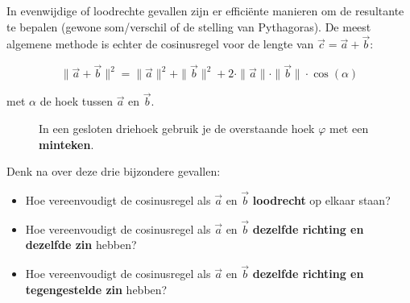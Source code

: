 \documentclass{ximera}
\begin{document}
In evenwijdige of loodrechte gevallen zijn er efficiënte manieren om de resultante te bepalen (gewone som/verschil of de stelling van Pythagoras). De meest algemene methode is echter de cosinusregel voor de lengte van $\vec{c} = \vec{a} + \vec{b}$:

\[ \| \vec{a} + \vec{b} \|^2 = \| \vec{a} \|^2 + \| \vec{b} \|^2 + 2 \cdot \|\vec{a}\| \cdot \|\vec{b}\| \cdot \cos(\alpha) \]

met $\alpha$ de hoek tussen $\vec{a}$ en $\vec{b}$.

\begin{figure}[ht!]
    \captionsetup{width=0.85\textwidth}
    \begin{center}
    \end{center}
    \caption{In een gesloten driehoek gebruik je de overstaande hoek $\varphi$ met een \textbf{minteken}.}
\end{figure}

\begin{question}
    Denk na over deze drie bijzondere gevallen:
    \begin{itemize}
        \item Hoe vereenvoudigt de cosinusregel als $\vec{a}$ en $\vec{b}$ \textbf{loodrecht} op elkaar staan? 
        \item Hoe vereenvoudigt de cosinusregel als $\vec{a}$ en $\vec{b}$ \textbf{dezelfde richting en dezelfde zin} hebben? 
        \item Hoe vereenvoudigt de cosinusregel als $\vec{a}$ en $\vec{b}$ \textbf{dezelfde richting en tegengestelde zin} hebben? 
    \end{itemize}
\end{question}
\end{document}
